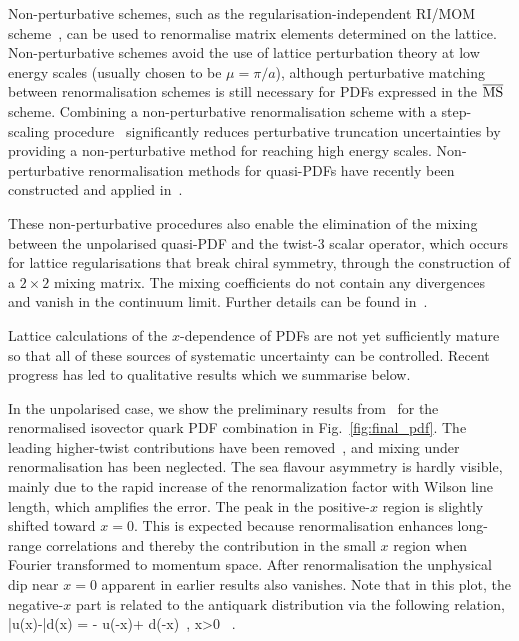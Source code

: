 \begin{itemize}
Non-perturbative schemes, such as the regularisation-independent 
RI/MOM scheme~\cite{Martinelli:1994ty}, can be used to renormalise matrix 
elements determined on the lattice. 
%
Non-perturbative schemes avoid the use of lattice perturbation theory at low 
energy scales (usually chosen to be $\mu = \pi/a$), although perturbative 
matching between renormalisation schemes is still necessary for PDFs expressed 
in the $\overline{\rm MS}$ scheme. 
%
Combining a non-perturbative renormalisation scheme with a step-scaling 
procedure~\cite{Luscher:1991wu} significantly reduces perturbative truncation 
uncertainties by providing a non-perturbative method for reaching high energy 
scales. 
%
Non-perturbative renormalisation methods for quasi-PDFs have recently been 
constructed and applied in~\cite{Alexandrou:2017huk,Chen:2017mzz}.

These non-perturbative procedures also enable the elimination of the mixing 
between the unpolarised quasi-PDF and the twist-3 scalar operator, 
which occurs for lattice regularisations that break chiral symmetry, 
through the construction of a $2\times2$ mixing matrix. 
%
The mixing coefficients do not contain any divergences and vanish in the 
continuum limit. 
%
Further details can be found in~\cite{Alexandrou:2017huk,Chen:2017mzz}. 
\end{itemize}

Lattice calculations of the $x$-dependence of PDFs are not yet sufficiently 
mature so that all of these sources of systematic uncertainty can be 
controlled. 
%
Recent progress has led to qualitative results which we 
summarise below.

In the unpolarised case, we show the preliminary results 
from~\cite{Chen:2017mzz} for the renormalised isovector quark PDF combination 
in Fig.~\ref{fig:final_pdf}. 
%
The leading higher-twist contributions have been removed~\cite{Chen:2016utp}, 
and mixing under renormalisation has been neglected. 
%
The sea flavour asymmetry is hardly visible, mainly due to the rapid increase 
of the renormalization factor with Wilson line length, which amplifies the 
error.
%
The peak in the positive-$x$ region is slightly shifted toward $x{=}0$. 
%
This is expected because renormalisation enhances long-range correlations and
thereby the contribution in the small $x$ region when Fourier transformed to 
momentum space. 
%
After renormalisation the unphysical dip near $x=0$ apparent in earlier 
results also vanishes.
%
Note that in this plot, the negative-$x$ part is related to the antiquark 
distribution via the following relation,
\be
\bar{u}(x)-\bar{d}(x) = - u(-x)+ d(-x)\, , \quad x>0 \, .
\ee

